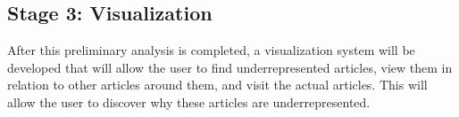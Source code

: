 \documentclass[fontsize=12pt]{article}
\begin{document}
\begin{multicols}{2}
    \subsection{Stage 3: Visualization}
    After this preliminary analysis is completed, a visualization system will be developed that will allow the user to find underrepresented articles, view them in relation to other articles around them, and visit the actual articles.
    This will allow the user to discover why these articles are underrepresented.





\end{multicols}
\end{document}
